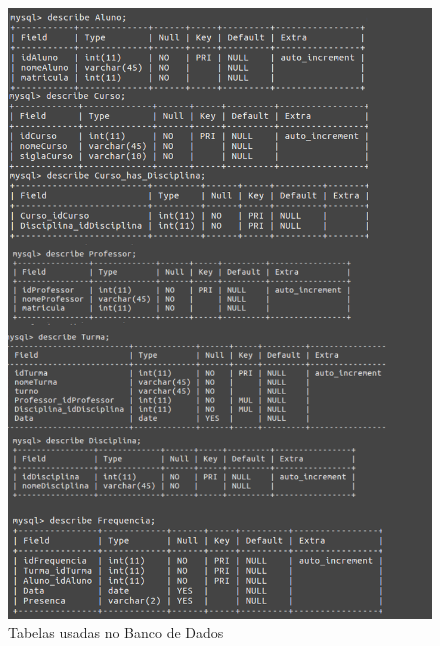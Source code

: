 \documentclass[12pt]{article}
\begin{document}
\begin{figure}[!htb]
\centering
\includegraphics[width=1\textwidth]{Tabelas_Final.png}
\caption{Tabelas usadas no Banco de Dados}
\label{fig:exampleFig3}
\end{figure}
\clearpage 
\end{document}
